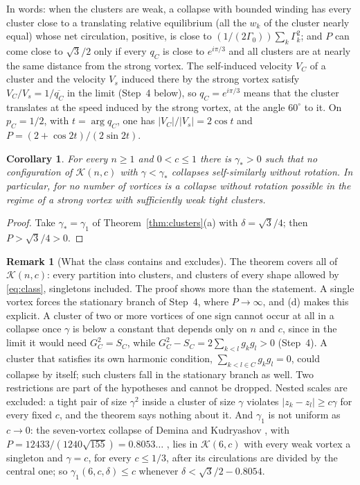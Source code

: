 \documentclass[11pt]{article}
\newtheorem{corollary}{Corollary}
\theoremstyle{definition}
\newtheorem{remark}{Remark}
\newcommand{\K}{\mathcal{K}}
\begin{document}
In words: when the clusters are weak, a collapse with bounded winding has every cluster close to a translating relative equilibrium (all the $w_k$ of the cluster nearly equal) whose net circulation, positive, is close to $(1/(2\Gamma_0))\sum_k \Gamma_k^2$; and $P$ can come close to $\sqrt{3}/2$ only if every $q_C$ is close to $e^{i\pi/3}$ and all clusters are at nearly the same distance from the strong vortex. The self-induced velocity $V_C$ of a cluster and the velocity $V_s$ induced there by the strong vortex satisfy $V_C/V_s = 1/\overline{q_C}$ in the limit (Step~4 below), so $q_C = e^{i\pi/3}$ means that the cluster translates at the speed induced by the strong vortex, at the angle $60^\circ$ to it. On $p_C = 1/2$, with $t = \arg q_C$, one has $|V_C|/|V_s| = 2\cos t$ and $P = (2 + \cos 2t)/(2\sin 2t)$.

\begin{corollary}\label{cor:norot}
For every $n \ge 1$ and $0 < c \le 1$ there is $\gamma_* > 0$ such that no configuration of $\K(n, c)$ with $\gamma < \gamma_*$ collapses self-similarly without rotation. In particular, for no number of vortices is a collapse without rotation possible in the regime of a strong vortex with sufficiently weak tight clusters.
\end{corollary}

\begin{proof}
Take $\gamma_* = \gamma_1$ of Theorem~\ref{thm:clusters}(a) with $\delta = \sqrt{3}/4$; then $P > \sqrt{3}/4 > 0$.
\end{proof}

\begin{remark}[What the class contains and excludes]\label{rem:class}
The theorem covers all of $\K(n, c)$: every partition into clusters, and clusters of every shape allowed by \eqref{eq:class}, singletons included. The proof shows more than the statement. A single vortex forces the stationary branch of Step~4, where $P \to \infty$, and (d) makes this explicit. A cluster of two or more vortices of one sign cannot occur at all in a collapse once $\gamma$ is below a constant that depends only on $n$ and $c$, since in the limit it would need $G_C^2 = S_C$, while $G_C^2 - S_C = 2\sum_{k<l} g_kg_l > 0$ (Step~4). A cluster that satisfies its own harmonic condition, $\sum_{k<l \in C} g_kg_l = 0$, could collapse by itself; such clusters fall in the stationary branch as well. Two restrictions are part of the hypotheses and cannot be dropped. Nested scales are excluded: a tight pair of size $\gamma^2$ inside a cluster of size $\gamma$ violates $|z_k - z_l| \ge c\gamma$ for every fixed $c$, and the theorem says nothing about it. And $\gamma_1$ is not uniform as $c \to 0$: the seven-vortex collapse of Demina and Kudryashov \cite[Table~1, Fig.~1a]{dk2014}, with $P = 12433/(1240\sqrt{155}) = 0.8053\ldots$ \cite[Sect.~3.2]{mw2026}, lies in $\K(6, c)$ with every weak vortex a singleton and $\gamma = c$, for every $c \le 1/3$, after its circulations are divided by the central one; so $\gamma_1(6, c, \delta) \le c$ whenever $\delta < \sqrt{3}/2 - 0.8054$.
\end{remark}
\end{document}
